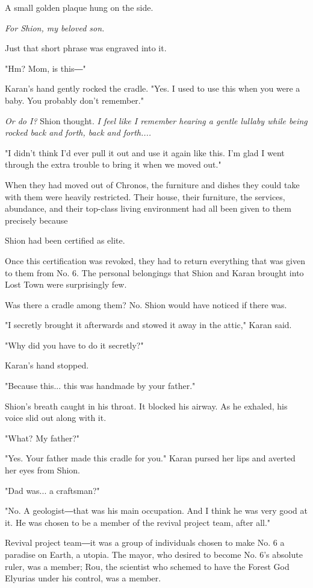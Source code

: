 A small golden plaque hung on the side.

\emph{For Shion, my beloved son.}

Just that short phrase was engraved into it.

"Hm? Mom, is this―"

Karan's hand gently rocked the cradle. "Yes. I used to use this when you
were a baby. You probably don't remember."

\emph{Or do I?} Shion thought. \emph{I feel like I remember hearing a gentle
lullaby while being rocked back and forth, back and forth....}

"I didn't think I'd ever pull it out and use it again like this. I'm
glad I went through the extra trouble to bring it when we moved out."

When they had moved out of Chronos, the furniture and dishes they could
take with them were heavily restricted. Their house, their furniture,
the services, abundance, and their top-class living environment had all
been given to them precisely because~

Shion had been certified as elite.

Once this certification was revoked, they had to return everything that
was given to them from No. 6. The personal belongings that Shion and
Karan brought into Lost Town were surprisingly few.~

Was there a cradle among them? No. Shion would have noticed if there
was.

"I secretly brought it afterwards and stowed it away in the attic,"
Karan said.

"Why did you have to do it secretly?"

Karan's hand stopped.

"Because this... this was handmade by your father."

Shion's breath caught in his throat. It blocked his airway. As he
exhaled, his voice slid out along with it.

"What? My father?"

"Yes. Your father made this cradle for you." Karan pursed her lips and
averted her eyes from Shion.

"Dad was... a craftsman?"

"No. A geologist―that was his main occupation. And I think he was very
good at it. He was chosen to be a member of the revival project team,
after all."

Revival project team―it was a group of individuals chosen to make No. 6
a paradise on Earth, a utopia. The mayor, who desired to become No. 6's
absolute ruler, was a member; Rou, the scientist who schemed to have the
Forest God Elyurias under his control, was a member.

